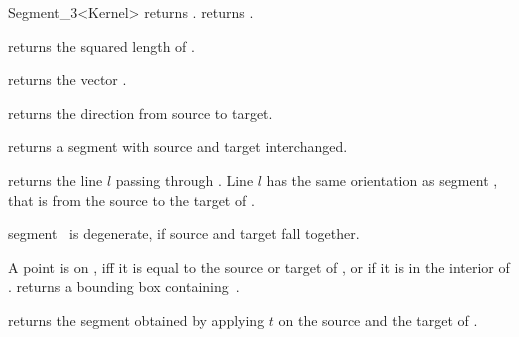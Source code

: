 \begin{ccRefClass} {Segment_3<Kernel>}
       {returns .}
\ccGlue
{}
       {returns .}

       {returns the squared length of \ccVar. }

       {returns the vector .}

       {returns the direction from source to target.}


       {returns a segment with source and target interchanged.}

       {returns the line $l$ passing through \ccVar. Line $l$  has the
        same orientation as segment \ccVar, that is 
        from the source to the target of \ccVar.}

       {segment \ccVar\ is degenerate, if source and target fall together.}


       {A point is on \ccVar, iff it is equal to the source or target
        of \ccVar, or if it is in the interior of \ccVar.}
% 
% 
       {returns a bounding box containing~\ccVar.}

       {returns the segment obtained by applying $t$ on the source
        and the target of \ccVar.}

\ccSeeAlso
{}\\

\end{ccRefClass} 
